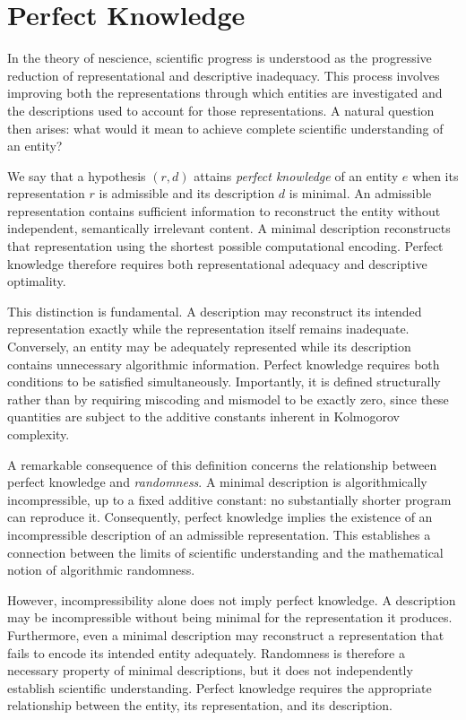 %
%

\section{Perfect Knowledge}

In the theory of nescience, scientific progress is understood as the progressive reduction of representational and descriptive inadequacy. This process involves improving both the representations through which entities are investigated and the descriptions used to account for those representations. A natural question then arises: what would it mean to achieve complete scientific understanding of an entity?

We say that a hypothesis $(r,d)$ attains \emph{perfect knowledge} of an entity $e$ when its representation $r$ is admissible and its description $d$ is minimal. An admissible representation contains sufficient information to reconstruct the entity without independent, semantically irrelevant content. A minimal description reconstructs that representation using the shortest possible computational encoding. Perfect knowledge therefore requires both representational adequacy and descriptive optimality.

This distinction is fundamental. A description may reconstruct its intended representation exactly while the representation itself remains inadequate. Conversely, an entity may be adequately represented while its description contains unnecessary algorithmic information. Perfect knowledge requires both conditions to be satisfied simultaneously. Importantly, it is defined structurally rather than by requiring miscoding and mismodel to be exactly zero, since these quantities are subject to the additive constants inherent in Kolmogorov complexity.

A remarkable consequence of this definition concerns the relationship between perfect knowledge and \emph{randomness}. A minimal description is algorithmically incompressible, up to a fixed additive constant: no substantially shorter program can reproduce it. Consequently, perfect knowledge implies the existence of an incompressible description of an admissible representation. This establishes a connection between the limits of scientific understanding and the mathematical notion of algorithmic randomness.

However, incompressibility alone does not imply perfect knowledge. A description may be incompressible without being minimal for the representation it produces. Furthermore, even a minimal description may reconstruct a representation that fails to encode its intended entity adequately. Randomness is therefore a necessary property of minimal descriptions, but it does not independently establish scientific understanding. Perfect knowledge requires the appropriate relationship between the entity, its representation, and its description.

